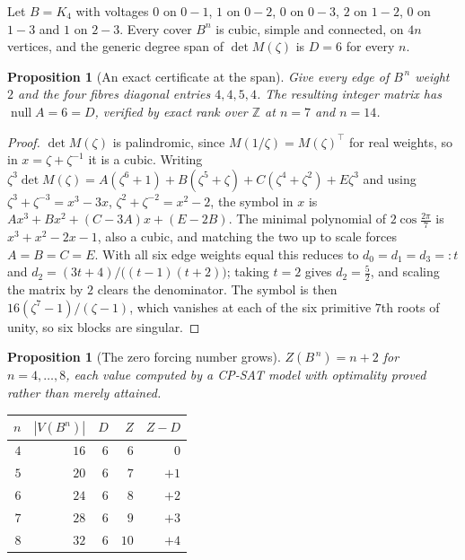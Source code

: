 \documentclass[11pt]{article}
\newtheorem{proposition}[theorem]{Proposition}
\theoremstyle{definition}
\begin{document}
Let $B=K_4$ with voltages $0$ on $0\!-\!1$, $1$ on $0\!-\!2$, $0$ on $0\!-\!3$,
$2$ on $1\!-\!2$, $0$ on $1\!-\!3$ and $1$ on $2\!-\!3$. Every cover $B^n$ is
cubic, simple and connected, on $4n$ vertices, and the generic degree span of
$\det M(\zeta)$ is $D=6$ for every $n$.

\begin{proposition}[An exact certificate at the span]\label{prop:k4cert}
Give every edge of $B^{\,n}$ weight $2$ and the four fibres diagonal entries
$4,4,5,4$. The resulting integer matrix has
$\operatorname{null}A=6=D$, verified by exact rank over $\mathbb Z$ at $n=7$
and $n=14$.
\end{proposition}

\begin{proof}
$\det M(\zeta)$ is palindromic, since $M(1/\zeta)=M(\zeta)^{\!\top}$ for real
weights, so in $x=\zeta+\zeta^{-1}$ it is a cubic. Writing
$\zeta^{3}\det M(\zeta)=A(\zeta^{6}{+}1)+B(\zeta^{5}{+}\zeta)+C(\zeta^{4}{+}\zeta^{2})+E\zeta^{3}$
and using $\zeta^{3}+\zeta^{-3}=x^{3}-3x$, $\zeta^{2}+\zeta^{-2}=x^{2}-2$, the
symbol in $x$ is $Ax^{3}+Bx^{2}+(C-3A)x+(E-2B)$. The minimal polynomial of
$2\cos\frac{2\pi}{7}$ is $x^{3}+x^{2}-2x-1$, also a cubic, and matching the two
up to scale forces $A=B=C=E$. With all six edge weights equal this reduces to
$d_0=d_1=d_3=:t$ and $d_2=(3t+4)/\bigl((t-1)(t+2)\bigr)$; taking $t=2$ gives
$d_2=\tfrac52$, and scaling the matrix by $2$ clears the denominator. The
symbol is then $16(\zeta^{7}-1)/(\zeta-1)$, which vanishes at each of the six
primitive $7$th roots of unity, so six blocks are singular.
\end{proof}

\begin{proposition}[The zero forcing number grows]\label{prop:k4z}
$Z(B^{\,n})=n+2$ for $n=4,\dots,8$, each value computed by a CP-SAT model with
optimality \emph{proved} rather than merely attained.
\end{proposition}

\begin{center}
\begin{tabular}{r r r r r}
\hline
$n$ & $|V(B^{n})|$ & $D$ & $Z$ & $Z-D$\\
\hline
$4$ & $16$ & $6$ & $6$ & $0$\\
$5$ & $20$ & $6$ & $7$ & $+1$\\
$6$ & $24$ & $6$ & $8$ & $+2$\\
$7$ & $28$ & $6$ & $9$ & $+3$\\
$8$ & $32$ & $6$ & $10$ & $+4$\\
\hline
\end{tabular}
\end{center}
\end{document}
